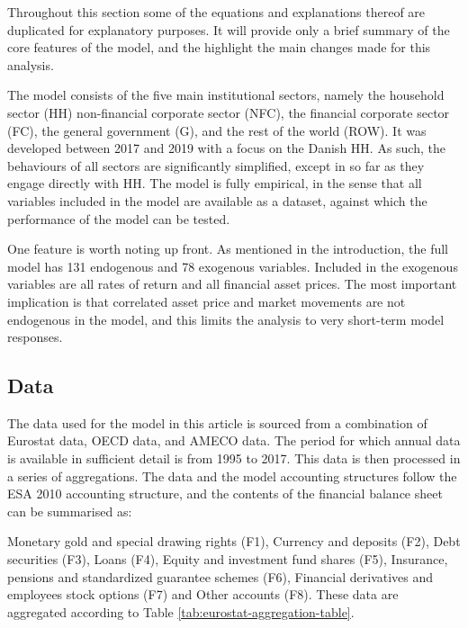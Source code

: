 \documentclass[
]{book}
\begin{document}
Throughout this section some of the equations and explanations thereof are duplicated for explanatory purposes. It will provide only a brief summary of the core features of the model, and the highlight the main changes made for this analysis.

The model consists of the five main institutional sectors, namely the household sector (HH) non-financial corporate sector (NFC), the financial corporate sector (FC), the general government (G), and the rest of the world (ROW). It was developed between 2017 and 2019 with a focus on the Danish HH. As such, the behaviours of all sectors are significantly simplified, except in so far as they engage directly with HH. The model is fully empirical, in the sense that all variables included in the model are available as a dataset, against which the performance of the model can be tested.

One feature is worth noting up front. As mentioned in the introduction, the full model has 131 endogenous and 78 exogenous variables. Included in the exogenous variables are all rates of return and all financial asset prices. The most important implication is that correlated asset price and market movements are not endogenous in the model, and this limits the analysis to very short-term model responses.

\hypertarget{data}{%
\subsection{Data}\label{data}}

The data used for the model in this article is sourced from a combination of Eurostat data, OECD data, and AMECO data. The period for which annual data is available in sufficient detail is from 1995 to 2017. This data is then processed in a series of aggregations. The data and the model accounting structures follow the ESA 2010 \citep{ESA2010} accounting structure, and the contents of the financial balance sheet can be summarised as:

Monetary gold and special drawing rights (F1), Currency and deposits (F2), Debt securities (F3), Loans (F4), Equity and investment fund shares (F5), Insurance, pensions and standardized guarantee schemes (F6), Financial derivatives and employees stock options (F7) and Other accounts (F8). These data are aggregated according to Table \ref{tab:eurostat-aggregation-table}.
\end{document}

